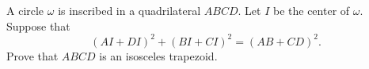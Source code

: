 A circle $\omega$ is inscribed in a quadrilateral $ABCD$. Let $I$ be the center of $\omega$. Suppose that \[

(AI + DI)^2 + (BI + CI)^2 = (AB + CD)^2.

\] Prove that $ABCD$ is an isosceles trapezoid.